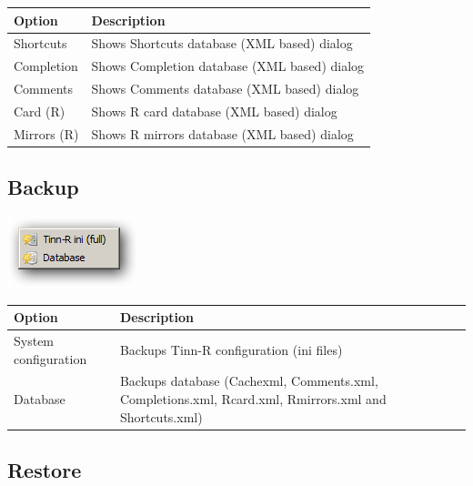 \begin{scriptsize}\begin{tabularx}{\textwidth}{>{\hsize=0.3\hsize}X>{\hsize=0.7\hsize}X}\\
    \hline
    \textbf{Option} & \textbf{Description} \\
    \hline
    Shortcuts & Shows Shortcuts database (XML based) dialog \\
    Completion & Shows Completion database (XML based) dialog \\
    Comments & Shows Comments database (XML based) dialog \\
    Card (R) & Shows R card database (XML based) dialog \\
    Mirrors (R) & Shows R mirrors database (XML based) dialog \\
    \hline
  \end{tabularx}\end{scriptsize}


\hypertarget{menu_tools_backup}{}
\subsection{Backup}

\includegraphics[scale=0.50]{./res/menu_tools_backup.png}\\

\begin{scriptsize}\begin{tabularx}{\textwidth}{>{\hsize=0.3\hsize}X>{\hsize=0.7\hsize}X}\\
    \hline
    \textbf{Option} & \textbf{Description} \\
    \hline
    System configuration & Backups Tinn-R configuration (ini files) \\
    Database & Backups database (Cachexml, Comments.xml, Completions.xml, Rcard.xml, Rmirrors.xml and Shortcuts.xml) \\
    \hline
  \end{tabularx}\end{scriptsize}


\hypertarget{menu_tools_restore}{}
\subsection{Restore}

